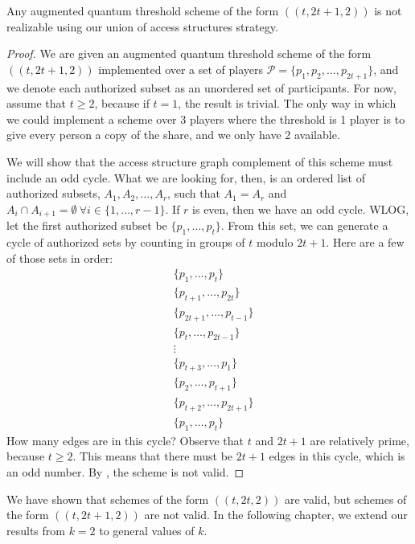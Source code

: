 \begin{theorem}
    \label{thm:t-2t+1-2}
    Any augmented quantum threshold scheme of the form $((t,2t+1,2))$ is not realizable using our union of  access structures strategy.
\end{theorem}
 
\begin{proof}
    We are given an augmented quantum threshold scheme of the form $((t,2t+1,2))$ implemented over a set of players $\mathcal{P} = \{p_1,p_2,\dots,p_{2t+1}\}$, and we denote each authorized subset as an unordered set of participants. For now, assume that $t \geq 2$, because if $t=1$, the result is trivial. The only way in which we could implement a scheme over 3 players where the threshold is 1 player is to give every person a copy of the share, and we only have 2 available. 
    
    We will show that the access structure graph complement of this scheme must include an odd cycle. What we are looking for, then, is an ordered list of authorized subsets, $A_1, A_2, \dots, A_r$, such that $A_1=A_r$ and $A_i \cap A_{i+1} = \emptyset \: \forall i \in \{1,\dots,r-1\}$. If $r$ is even, then we have an odd cycle. WLOG, let the first authorized subset be $\{p_1,\dots,p_{t}\}$. From this set, we can generate a cycle of authorized sets by counting in groups of $t$ modulo $2t+1$. Here are a few of those sets in order:
    \begin{align*}
        &\{p_1,\dots,p_{t}\} \\ 
        &\{p_{t+1},\dots,p_{2t}\} \\ 
        &\{p_{2t+1},\dots,p_{t-1}\} \\ 
        &\{p_{t},\dots,p_{2t-1}\} \\
        & \vdots \\
        &\{p_{t+3},\dots,p_{1}\} \\ 
        &\{p_{2},\dots,p_{t+1}\} \\ 
        &\{p_{t+2},\dots,p_{2t+1}\} \\ 
        &\{p_1,\dots,p_{t}\}
    \end{align*}
    How many edges are in this cycle? Observe that $t$ and $2t+1$ are relatively prime, because $t \geq 2$. This means that there must be $2t+1$ edges in this cycle, which is an odd number. By , the scheme is not valid.
\end{proof}

We have shown that schemes of the form $((t,2t,2))$ are valid, but schemes of the form $((t,2t+1,2))$ are not valid. In the following chapter, we extend our results from $k=2$ to general values of $k$.





